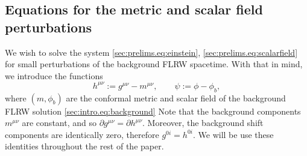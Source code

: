 \documentclass{article}
\newcommand{\pa}{\partial}
\begin{document}
\subsection{Equations for the metric and scalar field perturbations}
We wish to solve the system \eqref{sec:prelims.eq:einstein}, \eqref{sec:prelims.eq:scalarfield} for small perturbations of the background FLRW spacetime. With that in mind, we introduce the functions
\begin{equation}
     h^{\mu\nu} := g^{\mu\nu} - m^{\mu\nu},\qquad \psi := \phi - \phi_b,
\end{equation}
where $(m,\phi_b)$ are the conformal metric and scalar field of the background FLRW solution \eqref{sec:intro.eq:background}
Note that the background components $m^{\mu\nu}$ are constant, and so $\pa g^{\mu\nu} = \pa h^{\mu\nu}$. Moreover, the background shift components are identically zero, therefore $g^{0i} = h^{0i}$. We will be use these identities throughout the rest of the paper.
\end{document}
